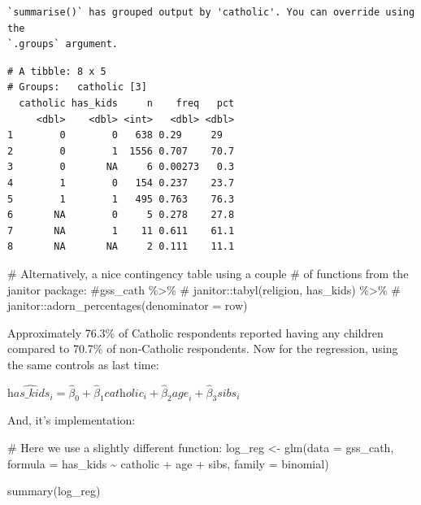 \documentclass[
  letterpaper,
]{book}
\newenvironment{Shaded}{\begin{snugshade}}{\end{snugshade}}
\newcommand{\AttributeTok}[1]{\textcolor[rgb]{0.40,0.45,0.13}{#1}}
\newcommand{\CommentTok}[1]{\textcolor[rgb]{0.37,0.37,0.37}{#1}}
\newcommand{\FunctionTok}[1]{\textcolor[rgb]{0.28,0.35,0.67}{#1}}
\newcommand{\NormalTok}[1]{\textcolor[rgb]{0.00,0.23,0.31}{#1}}
\newcommand{\OtherTok}[1]{\textcolor[rgb]{0.00,0.23,0.31}{#1}}
\newcommand{\SpecialCharTok}[1]{\textcolor[rgb]{0.37,0.37,0.37}{#1}}
\begin{document}
\begin{verbatim}
`summarise()` has grouped output by 'catholic'. You can override using the
`.groups` argument.
\end{verbatim}

\begin{verbatim}
# A tibble: 8 x 5
# Groups:   catholic [3]
  catholic has_kids     n    freq   pct
     <dbl>    <dbl> <int>   <dbl> <dbl>
1        0        0   638 0.29     29  
2        0        1  1556 0.707    70.7
3        0       NA     6 0.00273   0.3
4        1        0   154 0.237    23.7
5        1        1   495 0.763    76.3
6       NA        0     5 0.278    27.8
7       NA        1    11 0.611    61.1
8       NA       NA     2 0.111    11.1
\end{verbatim}

\begin{Shaded}
\begin{Highlighting}[]
\CommentTok{\# Alternatively, a nice contingency table using a couple }
\CommentTok{\# of functions from the janitor package:}
\CommentTok{\#gss\_cath \%\textgreater{}\%}
\CommentTok{\#  janitor::tabyl(religion, has\_kids) \%\textgreater{}\%}
\CommentTok{\#  janitor::adorn\_percentages(denominator = \textquotesingle{}row\textquotesingle{})}
\end{Highlighting}
\end{Shaded}

Approximately 76.3\% of Catholic respondents reported having any
children compared to 70.7\% of non-Catholic respondents. Now for the
regression, using the same controls as last time:

\(\widehat{\textit{has\_kids}_{i}} = \hat{\beta}_{0} +\hat{\beta}_{1}{\textit{catholic}}_{i} + \hat{\beta}_{2}{\textit{age}}_{i} + \hat{\beta}_{3}{\textit{sibs}}_{i}\)

And, it's implementation:

\begin{Shaded}
\begin{Highlighting}[]
\CommentTok{\# Here we use a slightly different function:}
\NormalTok{log\_reg }\OtherTok{\textless{}{-}} \FunctionTok{glm}\NormalTok{(}\AttributeTok{data =}\NormalTok{ gss\_cath, }
               \AttributeTok{formula =}\NormalTok{ has\_kids }\SpecialCharTok{\textasciitilde{}}\NormalTok{ catholic }\SpecialCharTok{+}\NormalTok{ age }\SpecialCharTok{+}\NormalTok{ sibs, }
               \AttributeTok{family =}\NormalTok{ binomial)}

\FunctionTok{summary}\NormalTok{(log\_reg)}
\end{Highlighting}
\end{Shaded}
\end{document}
